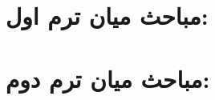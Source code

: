 \documentclass[12pt,a4paper]{book}
\begin{document}
	
	\chapter*{مباحث میان ترم اول:}
	
	\chapter*{مباحث میان ترم دوم:}
	
\end{document}
